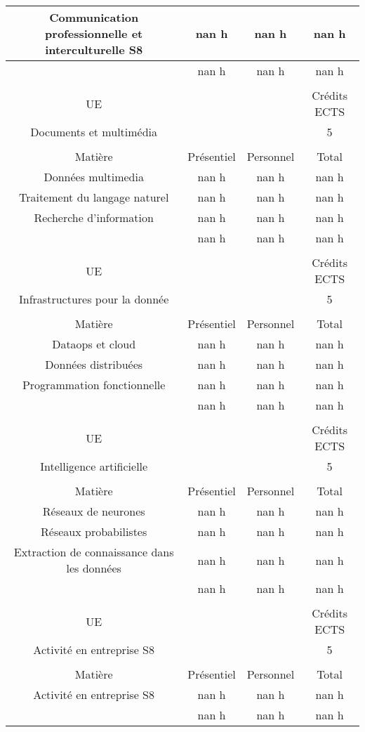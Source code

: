 \begin{longtable}{c c c c}
Communication professionnelle et interculturelle S8&nan h&nan h&nan h\\%
\hline%
&nan h&nan h&nan h\\%
\hline%
&&&\\%
UE&&&Crédits ECTS\\%
Documents et multimédia&&&5\\%
&&&\\%
Matière&Présentiel&Personnel&Total\\%
Données multimedia&nan h&nan h&nan h\\%
Traitement du langage naturel&nan h&nan h&nan h\\%
Recherche d'information&nan h&nan h&nan h\\%
\hline%
&nan h&nan h&nan h\\%
\hline%
&&&\\%
UE&&&Crédits ECTS\\%
Infrastructures pour la donnée&&&5\\%
&&&\\%
Matière&Présentiel&Personnel&Total\\%
Dataops et cloud&nan h&nan h&nan h\\%
Données distribuées&nan h&nan h&nan h\\%
Programmation fonctionnelle&nan h&nan h&nan h\\%
\hline%
&nan h&nan h&nan h\\%
\hline%
&&&\\%
UE&&&Crédits ECTS\\%
Intelligence artificielle&&&5\\%
&&&\\%
Matière&Présentiel&Personnel&Total\\%
Réseaux de neurones&nan h&nan h&nan h\\%
Réseaux probabilistes&nan h&nan h&nan h\\%
Extraction de connaissance dans les données&nan h&nan h&nan h\\%
\hline%
&nan h&nan h&nan h\\%
\hline%
&&&\\%
UE&&&Crédits ECTS\\%
Activité en entreprise S8&&&5\\%
&&&\\%
Matière&Présentiel&Personnel&Total\\%
Activité en entreprise S8&nan h&nan h&nan h\\%
\hline%
&nan h&nan h&nan h\\%
\hline%
\end{longtable}